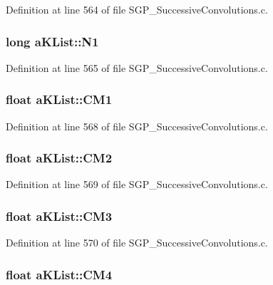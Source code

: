 Definition at line 564 of file SGP\_\-SuccessiveConvolutions.c.\hypertarget{structaKList_17c07250db10e89670ab0599183712e3}{
\subsubsection[N1]{\setlength{\rightskip}{0pt plus 5cm}long {\bf aKList::N1}}}
\label{d8/d05/structaKList_17c07250db10e89670ab0599183712e3}




Definition at line 565 of file SGP\_\-SuccessiveConvolutions.c.\hypertarget{structaKList_f383ae76f33475a6addcbc9f2502cbfa}{
\subsubsection[CM1]{\setlength{\rightskip}{0pt plus 5cm}float {\bf aKList::CM1}}}
\label{d8/d05/structaKList_f383ae76f33475a6addcbc9f2502cbfa}




Definition at line 568 of file SGP\_\-SuccessiveConvolutions.c.\hypertarget{structaKList_b44933c2ae3026bdf845082db23d3788}{
\subsubsection[CM2]{\setlength{\rightskip}{0pt plus 5cm}float {\bf aKList::CM2}}}
\label{d8/d05/structaKList_b44933c2ae3026bdf845082db23d3788}




Definition at line 569 of file SGP\_\-SuccessiveConvolutions.c.\hypertarget{structaKList_6b74a4853c5e8ec36e0ea09b750fa0ff}{
\subsubsection[CM3]{\setlength{\rightskip}{0pt plus 5cm}float {\bf aKList::CM3}}}
\label{d8/d05/structaKList_6b74a4853c5e8ec36e0ea09b750fa0ff}




Definition at line 570 of file SGP\_\-SuccessiveConvolutions.c.\hypertarget{structaKList_7fd06f954c0475bc6be8f7d8609c663a}{
\subsubsection[CM4]{\setlength{\rightskip}{0pt plus 5cm}float {\bf aKList::CM4}}}
\label{d8/d05/structaKList_7fd06f954c0475bc6be8f7d8609c663a}




